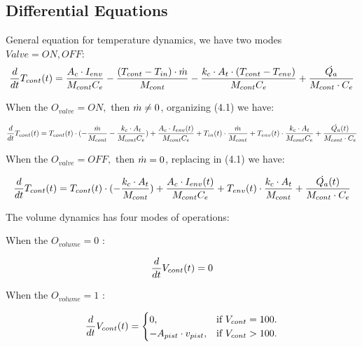 \documentclass[a4paper,12pt,twoside,openright]{book}
\begin{document}
\newpage

\subsection{Differential Equations}

General equation for temperature dynamics, we have two modes $Valve = {ON,OFF}$:
  \begin{equation}
          \frac{d}{dt}T_{cont}(t) = \frac{A_c\cdot I_{env}}{M_{cont}C_e} - \frac{(T_{cont}-T_{in})\cdot\dot{m}}{M_{cont}} - \frac{k_c\cdot A_t\cdot(T_{cont}-T_{env})}{M_{cont}C_e} + \frac{\dot{Q_{a}}}{M_{cont}\cdot C_e}        
  \end{equation}

When the $O_{valve} = ON, $ then $\dot{m} \neq 0$, organizing (4.1) we have:

\begin{equation}
       \frac{d}{dt}T_{cont}(t) = T_{cont}(t)\cdot(-\frac{\dot{m}}{M_{cont}}-\frac{k_c\cdot A_t}{M_{cont}C_e})+\frac{A_c\cdot I_{env}(t)}{M_{cont}C_e} + T_{in}(t)\cdot\frac{\dot{m}}{M_{cont}} + T_{env}(t)\cdot\frac{k_c\cdot A_t}{M_{cont}C_e} +  \frac{\dot{Q_{a}}(t)}{M_{cont}\cdot C_e}  
\end{equation}

When the $O_{valve} = OFF, $ then $\dot{m} = 0$, replacing in (4.1) we have:
        

\begin{equation}\frac{d}{dt}T_{cont}(t) = T_{cont}(t)\cdot(-\frac{k_c\cdot A_t}{M_{cont}})+\frac{A_c\cdot I_{env}(t)}{M_{cont}C_e} + T_{env}(t)\cdot\frac{k_c\cdot A_t}{M_{cont}} +  \frac{\dot{Q_{a}}(t)}{M_{cont}\cdot C_e}   
\end{equation}

\vspace{5mm}

The volume dynamics has four modes of operations:

\vspace{5mm}

When the $O_{volume} = 0$ :

\begin{equation}
        \frac{d}{dt}V_{cont}(t) = 0
\end{equation}

When the $O_{volume} = 1$ :

\begin{equation}
  \frac{d}{dt}V_{cont}(t)=\begin{cases}
    0, & \text{if $V_{cont}=100$}.\\
    -A_{pist} \cdot v_{pist}, & \text{if $V_{cont}>100$}.
  \end{cases}
\end{equation}
\end{document}
